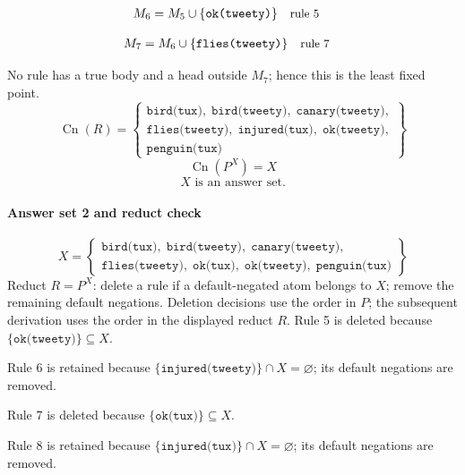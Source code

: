 \documentclass[a4paper,11pt]{article}
\newif\ifexplain
\newcommand{\explain}[1]{\ifexplain\begin{erklbox}#1\end{erklbox}\fi}
\newcommand{\why}[1]{\text{\small #1}}
\newcommand{\at}[1]{\texttt{#1}}
\begin{document}
\begin{align*}
M_{6} &= M_{5}\cup \{\at{ok(tweety)}\} && \why{rule 5}
\end{align*}
\explain{Für $\at{ok(tweety)}$ brauchen wir $\at{bird(tweety)}$. Weil diese Voraussetzungen bereits hergeleitet sind, dürfen wir den Regelkopf jetzt aufnehmen und alle bisherigen Atome behalten; bei einer fehlenden Voraussetzung würde diese Regel dagegen noch nichts beitragen.}
\begin{align*}
M_{7} &= M_{6}\cup \{\at{flies(tweety)}\} && \why{rule 7}
\end{align*}
\explain{Für $\at{flies(tweety)}$ brauchen wir $\at{ok(tweety)}$. Weil diese Voraussetzungen bereits hergeleitet sind, dürfen wir den Regelkopf jetzt aufnehmen und alle bisherigen Atome behalten; bei einer fehlenden Voraussetzung würde diese Regel dagegen noch nichts beitragen.}
No rule has a true body and a head outside $M_{7}$; hence this is the least fixed point.
\[
\operatorname{Cn}(R)=\left\{\begin{gathered}\at{bird(tux)},\;\at{bird(tweety)},\;\at{canary(tweety)},\\\at{flies(tweety)},\;\at{injured(tux)},\;\at{ok(tweety)},\\\at{penguin(tux)}\end{gathered}\right\}
\]
\[
\operatorname{Cn}(P^X)=X
\]
\[
\boxed{X\text{ is an answer set.}}
\]
\paragraph{Answer set 2 and reduct check}
\[
X=\left\{\begin{gathered}\at{bird(tux)},\;\at{bird(tweety)},\;\at{canary(tweety)},\\\at{flies(tweety)},\;\at{ok(tux)},\;\at{ok(tweety)},\;\at{penguin(tux)}\end{gathered}\right\}
\]
Reduct $R=P^X$: delete a rule if a default-negated atom belongs to $X$; remove the remaining default negations. Deletion decisions use the order in $P$; the subsequent derivation uses the order in the displayed reduct $R$.
Rule 5 is deleted because $\{\at{ok(tweety)}\}\subseteq X$.

Rule 6 is retained because $\{\at{injured(tweety)}\}\cap X=\varnothing$; its default negations are removed.

Rule 7 is deleted because $\{\at{ok(tux)}\}\subseteq X$.

Rule 8 is retained because $\{\at{injured(tux)}\}\cap X=\varnothing$; its default negations are removed.
\end{document}
